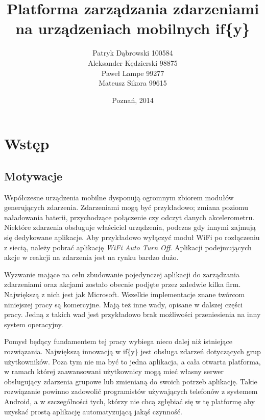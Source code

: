 \documentclass[11pt,a4paper,polish,thesis]{dcsbook}
\begin{document}
\author{Patryk Dąbrowski 100584\\ Aleksander Kędzierski 98875\\ Paweł Lampe 99277\\ Mateusz Sikora 99615}
\title{Platforma zarządzania zdarzeniami na urządzeniach mobilnych if\{y\}}
\date{Poznań, 2014}

\maketitle

\frontmatter

\tableofcontents{}

\mainmatter

\chapter{Wstęp}
\section{Motywacje}
Współczesne urządzenia mobilne dysponują ogromnym zbiorem modułów generujących zdarzenia. Zdarzeniami mogą być przykładowo; zmiana poziomu naładowania
baterii, przychodzące połączenie czy odczyt danych akcelerometru. Niektóre zdarzenia obsługuje właściciel urządzenia, podczas gdy innymi zajmują się dedykowane
aplikacje. Aby przykładowo wyłączyć moduł WiFi po rozłączeniu z siecią, należy pobrać aplikację \emph{WiFi Auto Turn Off}. Aplikacji podejmujących akcje w reakcji
na zdarzenia jest na rynku bardzo dużo.

Wyzwanie mające na celu zbudowanie pojedynczej aplikacji do zarządzania zdarzeniami oraz akcjami zostało obecnie podjęte przez zaledwie kilka firm. Największą z nich
jest jak Microsoft. Wszelkie implementacje znane twórcom niniejszej pracy są komercyjne. Mają też inne wady, opisane w dalszej części pracy. Jedną z takich wad jest
przykładowo brak możliwości przeniesienia na inny system operacyjny.

Pomysł będący fundamentem tej pracy wybiega nieco dalej niż istniejące rozwiązania. Największą innowacją w if\{y\} jest obsługa zdarzeń dotyczących grup użytkowników.
Poza tym nie ma być to jedna aplikacja, a cała otwarta platforma, w ramach której zaawansowani użytkownicy mogą mieć własny serwer obsługujący zdarzenia grupowe lub
zmienianą do swoich potrzeb aplikację. Takie rozwiązanie powinno zadowolić programistów używających telefonów z systemem Android, a w szczególności tych, którzy nie
chcą zgłębiać się w tę platformę aby uzyskać prostą aplikację automatyzującą jakąś czynność.
\end{document}
